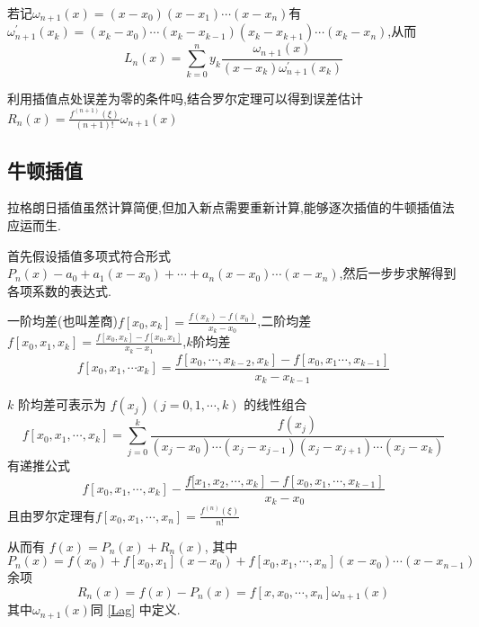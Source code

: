 \documentclass[10pt]{yerbaformat}
\begin{document}
\par 若记$\omega_{n+1}(x)=\left(x-x_{0}\right)\left(x-x_{1}\right) \cdots\left(x-x_{n}\right)$有$\omega_{n+1}^{\prime}\left(x_{k}\right)=\left(x_{k}-x_{0}\right) \cdots\left(x_{k}-x_{k-1}\right)\left(x_{k}-x_{k+1}\right) \cdots\left(x_{k}-x_{n}\right)$,从而$$L_{n}(x)=\sum_{k=0}^{n} y_{k} \frac{\omega_{n+1}(x)}{\left(x-x_{k}\right) \omega_{n+1}^{\prime}\left(x_{k}\right)}$$

\par 利用插值点处误差为零的条件吗,结合罗尔定理可以得到误差估计$R_{n}(x)=\frac{f^{(n+1)}(\xi)}{(n+1) !} \omega_{n+1}(x)$

\subsection{牛顿插值}
\par 拉格朗日插值虽然计算简便,但加入新点需要重新计算,能够逐次插值的牛顿插值法应运而生.

\par 首先假设插值多项式符合形式$P_{n}(x)-a_{0}+a_{1}\left(x-x_{0}\right)+\cdots+a_{n}\left(x-x_{0}\right) \cdots\left(x-x_{n}\right)$,然后一步步求解得到各项系数的表达式.

\begin{definition}
    一阶均差(也叫差商)$f\left[x_{0}, x_{k}\right]=\frac{f\left(x_{k}\right)-f\left(x_{0}\right)}{x_{k}-x_{0}}$,二阶均差$f\left[x_{0}, x_{1}, x_{k}\right]=\frac{f\left[x_{0}, x_{k}\right]-f\left[x_{0}, x_{1}\right]}{x_{k}-x_{1}}$,$k$阶均差$$f\left[x_{0}, x_{1}, \cdots x_{k}\right]=\frac{f\left[x_{0}, \cdots, x_{k-2}, x_{k}\right]-f\left[x_{0}, x_{1} \cdots, x_{k-1}\right]}{x_{k}-x_{k-1}}$$
\end{definition}

\begin{property}
    $k$ 阶均差可表示为 $f\left(x_{j}\right)(j=0,1, \cdots, k)$ 的线性组合
    $$f\left[x_{0}, x_{1}, \cdots, x_{k}\right]=\sum_{j=0}^{k} \frac{f\left(x_{j}\right)}{\left(x_{j}-x_{0}\right) \cdots\left(x_{j}-x_{j-1}\right)\left(x_{j}-x_{j+1}\right) \cdots\left(x_{j}-x_{k}\right)}$$有递推公式$$f\left[x_{0}, x_{1}, \cdots, x_{k}\right]-\frac{\left.f[x_{1}, x_{2}, \cdots, x_{k}\right]-f\left[x_{0}, x_{1}, \cdots, x_{k-1}\right]}{x_{k}-x_{0}}$$且由罗尔定理有$f\left[x_{0}, x_{1}, \cdots, x_{n}\right]=\frac{f^{(n)}(\xi)}{n !}$
\end{property}

\par 从而有 $f(x)=P_{n}(x)+R_{n}(x)$, 其中 $$P_{n}(x)=f\left(x_{0}\right)+f\left[x_{0}, x_{1}\right]\left(x-x_{0}\right) +f\left[x_{0}, x_{1}, \cdots, x_{n}\right]\left(x-x_{0}\right) \cdots\left(x-x_{n-1}\right) $$余项$$R_{n}(x)=f(x)-P_{n}(x)=f\left[x, x_{0}, \cdots, x_{n}\right] \omega_{n+1}(x)$$其中$\omega_{n+1}(x)$同 \ref{Lag} 中定义.
\end{document}

